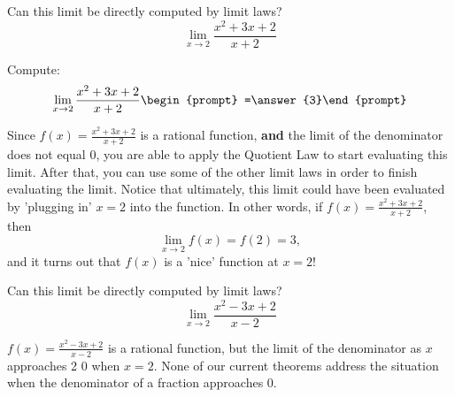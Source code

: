 \documentclass{ximera}
\begin{document}
\begin{question}
  Can this limit be directly computed by limit laws?
  \[
  \displaystyle\lim_{x\to 2}\frac{x^2+3x+2}{x+2} 
  \]
  \begin{multipleChoice}
  \end{multipleChoice}
  \begin{question}
    Compute:
    \[
    \displaystyle\lim_{x\to 2}\frac{x^2+3x+2}{x+2}\begin{prompt} =\answer{3}\end{prompt}
    \]
    \begin{feedback}
      Since $f(x)=\frac{x^2+3x+2}{x+2}$ is a rational function, \textbf{and}
      the limit of the denominator does not equal $0$, you are able to apply the Quotient Law to start evaluating this limit.  After that, you can use some of the other limit laws in order to finish evaluating the limit.  Notice that ultimately, this limit could have been evaluated by 'plugging in' $x=2$ into the function.  In other words, if $f(x) = \frac{x^2+3x+2}{x+2}$, then $$\displaystyle\lim_{x\to 2} f(x) = f(2) = 3,$$ and it turns out that $f(x)$ is a 'nice' function at $x=2$!  
    \end{feedback}
  \end{question}
\end{question}

\begin{question}
  Can this limit be directly computed by limit laws?
  \[
  \displaystyle\lim_{x\to 2}\frac{x^2-3x+2}{x-2}
  \]
  \begin{multipleChoice}
  \end{multipleChoice}
  \begin{feedback}
    $f(x) = \frac{x^2-3x+2}{x-2}$ is a rational function, but the limit of the denominator as $x$ approaches 2 $0$ when $x=2$. None of our current
    theorems address the situation when the denominator of a fraction
    approaches $0$.  
  \end{feedback}
\end{question}
\end{document}
